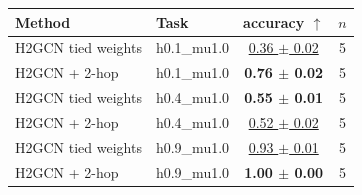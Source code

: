 \begin{tabular}{llcc}
\toprule
Method & Task & accuracy $\uparrow$ & $n$ \\
\midrule
H2GCN tied weights & h0.1\_mu1.0 & \underline{0.36 $\pm$ 0.02} & 5 \\
H2GCN + 2-hop & h0.1\_mu1.0 & \textbf{0.76 $\pm$ 0.02} & 5 \\
\midrule
H2GCN tied weights & h0.4\_mu1.0 & \textbf{0.55 $\pm$ 0.01} & 5 \\
H2GCN + 2-hop & h0.4\_mu1.0 & \underline{0.52 $\pm$ 0.02} & 5 \\
\midrule
H2GCN tied weights & h0.9\_mu1.0 & \underline{0.93 $\pm$ 0.01} & 5 \\
H2GCN + 2-hop & h0.9\_mu1.0 & \textbf{1.00 $\pm$ 0.00} & 5 \\
\bottomrule
\end{tabular}
